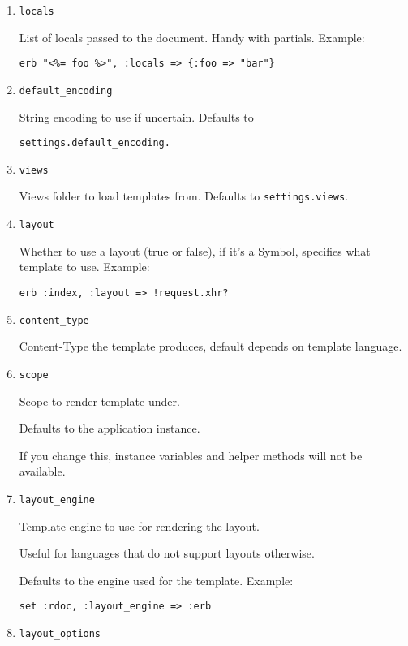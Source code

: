 \begin{enumerate}
\item \verb|locals|

List of locals passed to the document. Handy with partials. Example: 
\begin{verbatim}
erb "<%= foo %>", :locals => {:foo => "bar"}
\end{verbatim}
\item \verb|default_encoding|

String encoding to use if uncertain. Defaults to 
\begin{verbatim}
settings.default_encoding.
\end{verbatim}

\item 
\verb|views|

Views folder to load templates from. Defaults to \verb|settings.views|.

\item 
\verb|layout|

Whether to use a layout (true or false), if it's a Symbol, specifies what template to use. Example: 
\begin{verbatim}
erb :index, :layout => !request.xhr?
\end{verbatim}

\item 
\verb|content_type|

Content-Type the template produces, default depends on template language.

\item 
\verb|scope|

Scope to render template under. 

Defaults to the application instance. 

If you change this, instance variables and helper methods will not be available.

\item 
\verb|layout_engine|

Template engine to use for rendering the layout. 

Useful for languages
that do not support layouts otherwise. 

Defaults to the engine used
for the template. Example: 

\begin{verbatim}
set :rdoc, :layout_engine => :erb
\end{verbatim}

\item 
\verb|layout_options|


\end{enumerate}
